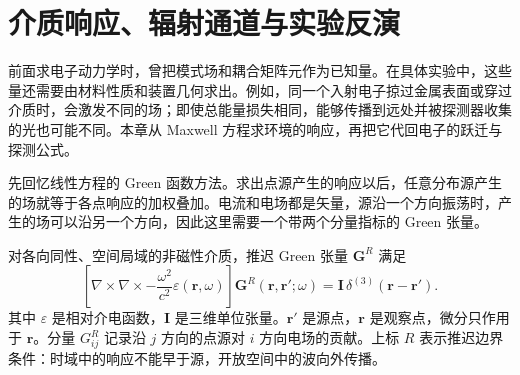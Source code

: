 \chapter{介质响应、辐射通道与实验反演}\label{chap:media-radiation}

前面求电子动力学时，曾把模式场和耦合矩阵元作为已知量。在具体实验中，这些量还需要由材料性质和装置几何求出。例如，同一个入射电子掠过金属表面或穿过介质时，会激发不同的场；即使总能量损失相同，能够传播到远处并被探测器收集的光也可能不同。本章从 Maxwell 方程求环境的响应，再把它代回电子的跃迁与探测公式。

先回忆线性方程的 Green 函数方法。求出点源产生的响应以后，任意分布源产生的场就等于各点响应的加权叠加。电流和电场都是矢量，源沿一个方向振荡时，产生的场可以沿另一个方向，因此这里需要一个带两个分量指标的 Green 张量。\begin{definition}
对各向同性、空间局域的非磁性介质，推迟 Green 张量 $\mathbf G^R$ 满足
\begin{equation}
\boxed{
\left[\nabla\times\nabla\times
-\frac{\omega^2}{c^2}\varepsilon(\mathbf r,\omega)\right]
\mathbf G^R(\mathbf r,\mathbf r';\omega)
=\mathbf I\,\delta^{(3)}(\mathbf r-\mathbf r').}
\label{eq:retarded_green_tensor_beginner_definition_dp123}
\end{equation}
其中 $\varepsilon$ 是相对介电函数，$\mathbf I$ 是三维单位张量。$\mathbf r'$ 是源点，$\mathbf r$ 是观察点，微分只作用于 $\mathbf r$。分量 $G^R_{ij}$ 记录沿 $j$ 方向的点源对 $i$ 方向电场的贡献。上标 $R$ 表示推迟边界条件：时域中的响应不能早于源，开放空间中的波向外传播。
\end{definition}

